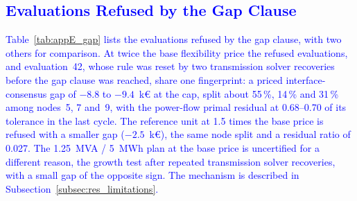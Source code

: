 \documentclass[preprint,12pt]{elsarticle}
\begin{document}
\subsection{\textcolor{blue}{Evaluations Refused by the Gap Clause}}
\label{app:results_gap}

\textcolor{blue}{
    Table~\ref{tab:appE_gap} lists the evaluations refused by the gap clause, with two others for comparison. At twice the base flexibility price the refused evaluations, and evaluation~42, whose rule was reset by two transmission solver recoveries before the gap clause was reached, share one fingerprint: a priced interface-consensus gap of $-8.8$ to $-9.4$~k\euro{} at the cap, split about 55\,\%, 14\,\% and 31\,\% among nodes~5, 7 and~9, with the power-flow primal residual at 0.68--0.70 of its tolerance in the last cycle. The reference unit at 1.5 times the base price is refused with a smaller gap ($-2.5$~k\euro), the same node split and a residual ratio of 0.027. The 1.25~MVA / 5~MWh plan at the base price is uncertified for a different reason, the growth test after repeated transmission solver recoveries, with a small gap of the opposite sign. The mechanism is described in Subsection~\ref{subsec:res_limitations}.
}
\end{document}
